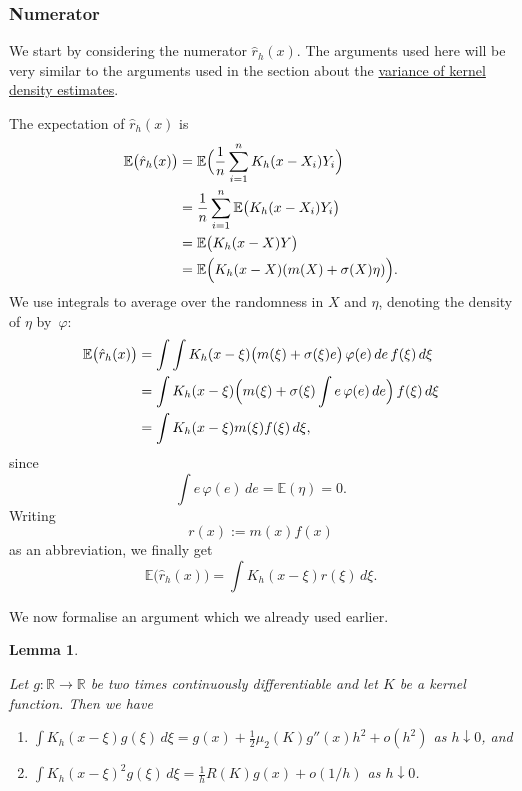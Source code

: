 \documentclass[
  a4paper,
]{article}
\providecommand{\tightlist}{%
  \setlength{\itemsep}{0pt}\setlength{\parskip}{0pt}}
\newtheorem{lemma}{Lemma}[section]
\theoremstyle{definition}
\theoremstyle{definition}
\theoremstyle{definition}
\theoremstyle{definition}
\theoremstyle{remark}
\begin{document}
\hypertarget{numerator}{%
\subsubsection*{Numerator}\label{numerator}}

We start by considering the numerator \(\hat r_h(x)\). The arguments used here
will be very similar to the arguments used in the section about the
\protect\hyperlink{X03-Var}{variance of kernel density estimates}.

The expectation of \(\hat r_h(x)\) is
\begin{align*}
  \mathbb{E}\bigl( \hat r_h(x) \bigr)
  &= \mathbb{E}\Bigl( \frac1n \sum_{i=1}^n K_h(x - X_i) Y_i \Bigr) \\
  &= \frac1n \sum_{i=1}^n \mathbb{E}\bigl( K_h(x - X_i) Y_i \bigr) \\
  &= \mathbb{E}\bigl( K_h(x - X) Y \bigr) \\
  &= \mathbb{E}\Bigl( K_h(x - X) (m(X) + \sigma(X)\eta) \Bigr).
\end{align*}
We use integrals to average over the randomness in \(X\) and \(\eta\),
denoting the density of \(\eta\) by~\(\varphi\):
\begin{align*}
  \mathbb{E}\bigl( \hat r_h(x) \bigr)
  &= \int \int K_h(x - \xi) \bigl( m(\xi) + \sigma(\xi) e \bigr) \, \varphi(e) \, de \, f(\xi) \, d\xi \\
  &= \int K_h(x - \xi) \Bigl( m(\xi) +\sigma(\xi) \int e \, \varphi(e) \, de \Bigr) \, f(\xi) \, d\xi \\
  &= \int K_h(x - \xi) m(\xi) f(\xi) \, d\xi,
\end{align*}
since
\begin{equation*}
  \int e \, \varphi(e) \, de
  = \mathbb{E}(\eta)
  = 0.
\end{equation*}
Writing
\begin{equation*}
  r(x)
  := m(x) f(x)
\end{equation*}
as an abbreviation, we finally get
\begin{equation*}
  \mathbb{E}\bigl( \hat r_h(x) \bigr)
  = \int K_h(x - \xi) r(\xi) \, d\xi.
\end{equation*}

We now formalise an argument which we already used earlier.

\begin{lemma}
\protect\hypertarget{lem:kernel-limit}{}\label{lem:kernel-limit}

Let \(g\colon \mathbb{R}\to \mathbb{R}\) be two times continuously differentiable
and let \(K\) be a kernel function. Then we have

\begin{enumerate}
\def\labelenumi{\arabic{enumi}.}
\tightlist
\item
  \(\displaystyle\int K_h(x - \xi) g(\xi) \, d\xi = g(x) + \frac12 \mu_2(K) g''(x) h^2 + o(h^2)\)
  as \(h \downarrow 0\), and
\item
  \(\displaystyle\int K_h(x - \xi)^2 g(\xi) \, d\xi = \frac1h R(K) g(x) + o(1/h)\)
  as \(h \downarrow 0\).
\end{enumerate}

\end{lemma}
\end{document}
